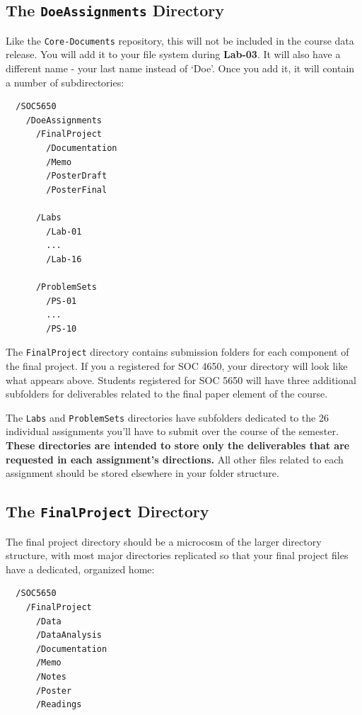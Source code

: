 \documentclass[]{book}
\theoremstyle{definition}
\theoremstyle{definition}
\theoremstyle{remark}
\begin{document}
\subsection{\texorpdfstring{The \texttt{DoeAssignments}
Directory}{The DoeAssignments Directory}}\label{the-doeassignments-directory}

Like the \texttt{Core-Documents} repository, this will not be included
in the course data release. You will add it to your file system during
\textbf{Lab-03}. It will also have a different name - your last name
instead of `Doe'. Once you add it, it will contain a number of
subdirectories:

\begin{verbatim}
  /SOC5650
    /DoeAssignments
      /FinalProject
        /Documentation
        /Memo
        /PosterDraft
        /PosterFinal

      /Labs
        /Lab-01
        ...
        /Lab-16

      /ProblemSets
        /PS-01
        ...
        /PS-10
\end{verbatim}

The \texttt{FinalProject} directory contains submission folders for each
component of the final project. If you a registered for SOC 4650, your
directory will look like what appears above. Students registered for SOC
5650 will have three additional subfolders for deliverables related to
the final paper element of the course.

The \texttt{Labs} and \texttt{ProblemSets} directories have subfolders
dedicated to the 26 individual assignments you'll have to submit over
the course of the semester. \textbf{These directories are intended to
store only the deliverables that are requested in each assignment's
directions.} All other files related to each assignment should be stored
elsewhere in your folder structure.

\subsection{\texorpdfstring{The \texttt{FinalProject}
Directory}{The FinalProject Directory}}\label{the-finalproject-directory}

The final project directory should be a microcosm of the larger
directory structure, with most major directories replicated so that your
final project files have a dedicated, organized home:

\begin{verbatim}
  /SOC5650
    /FinalProject
      /Data
      /DataAnalysis
      /Documentation
      /Memo
      /Notes
      /Poster
      /Readings
\end{verbatim}
\end{document}
